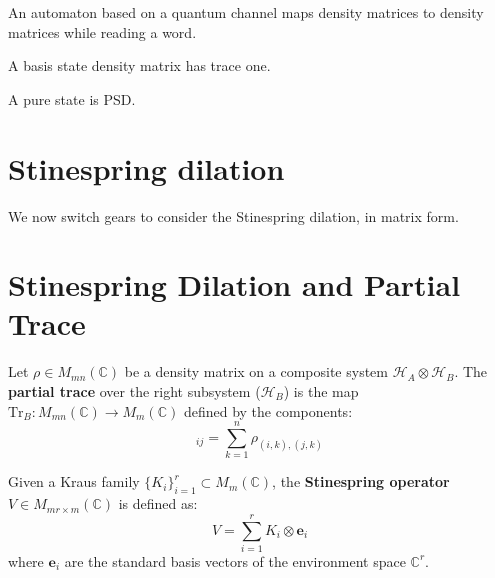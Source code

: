 \begin{lemma}\label{krausApplyWord_densityMatrix}
	\leanok
	An automaton based on a quantum channel maps density matrices to density matrices while reading a word.
\end{lemma}

\begin{lemma}\label{basisState_trace_one}
	\leanok
	A basis state density matrix has trace one.
\end{lemma}

\begin{lemma}\label{pureState_psd}
	\leanok
	A pure state is PSD.
\end{lemma}

\section{Stinespring dilation}
We now switch gears to consider the Stinespring dilation, in matrix form.

\section*{Stinespring Dilation and Partial Trace}

\begin{definition}
Let $\rho \in M_{mn}(\mathbb{C})$ be a density matrix on a composite system $\mathcal{H}_A \otimes \mathcal{H}_B$. The \textbf{partial trace} over the right subsystem ($\mathcal{H}_B$) is the map $\text{Tr}_B : M_{mn}(\mathbb{C}) \to M_m(\mathbb{C})$ defined by the components:
\begin{equation}
    [\text{Tr}_B(\rho)]_{ij} = \sum_{k=1}^n \rho_{(i,k),(j,k)}
\end{equation}
\end{definition}

\begin{definition}
Given a Kraus family $\{K_i\}_{i=1}^r \subset M_m(\mathbb{C})$, the \textbf{Stinespring operator} $V \in M_{mr \times m}(\mathbb{C})$ is defined as:
\begin{equation}
    V = \sum_{i=1}^r K_i \otimes \mathbf{e}_i
\end{equation}
where $\mathbf{e}_i$ are the standard basis vectors of the environment space $\mathbb{C}^r$.
\end{definition}

